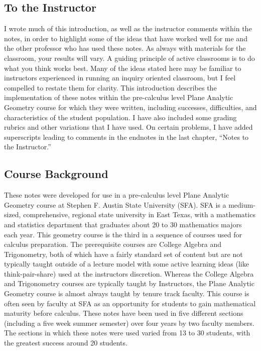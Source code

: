 \begin{annotation}
\chapter{To the Instructor}
I wrote much of this introduction, as well as the instructor comments within the notes, in order to highlight some of the ideas that have worked well for me and the other professor who has used these notes. As always with materials for the classroom, your results will vary. A guiding principle of active classrooms is to do what you think works best. Many of the ideas stated here may be familiar to instructors experienced in running an inquiry oriented classroom, but I feel compelled to restate them for clarity.
This introduction describes the implementation of these notes within the pre-calculus level Plane Analytic Geometry course for which they were written, including successes, difficulties, and characteristics of the student population. I have also included some grading rubrics and other variations that I have used. On certain problems, I have added superscripts leading to comments in the endnotes in the last chapter, “Notes to the Instructor.”

\section{Course Background}
These notes were developed for use in a pre-calculus level Plane Analytic Geometry course at Stephen F. Austin State University (SFA). SFA is a medium-sized, comprehensive, regional state university in East Texas, with a mathematics and statistics department that graduates about 20 to 30 mathematics majors each year. This geometry course is the third in a sequence of courses used for calculus preparation. The prerequisite courses are College Algebra and Trigonometry, both of which have a fairly standard set of content but are not typically taught outside of a lecture model with some active learning ideas (like think-pair-share) used at the instructors discretion. Whereas the College Algebra and Trigonometry courses are typically taught by Instructors, the Plane Analytic Geometry course is almost always taught by tenure track faculty. This course is often seen by faculty at SFA as an opportunity for students to gain mathematical maturity before calculus. These notes have been used in five different sections (including a five week summer semester) over four years by two faculty members. The sections in which these notes were used varied from 13 to 30 students, with the greatest success around 20 students.


\end{annotation}

